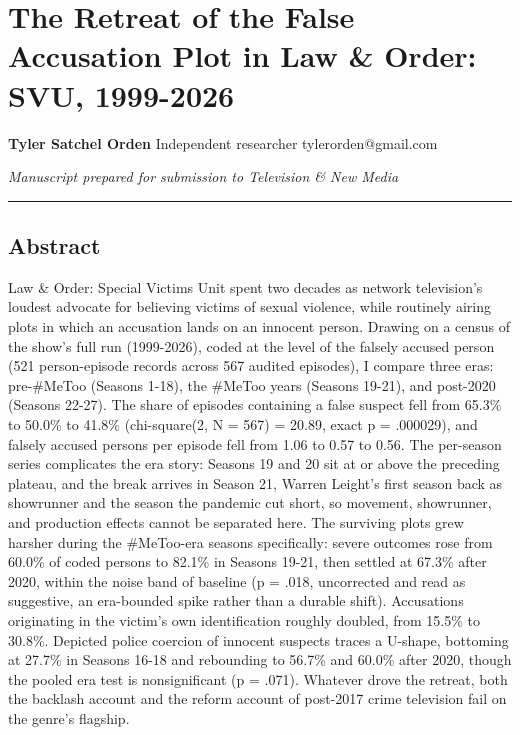 \documentclass[
]{article}
\author{}
\date{}
\begin{document}
\section{The Retreat of the False Accusation Plot in Law \& Order: SVU,
1999-2026}\label{the-retreat-of-the-false-accusation-plot-in-law-order-svu-1999-2026}

\textbf{Tyler Satchel Orden} Independent researcher tylerorden@gmail.com

\emph{Manuscript prepared for submission to Television \& New Media}

\begin{center}\rule{0.5\linewidth}{0.5pt}\end{center}

\subsection{Abstract}\label{abstract}

Law \& Order: Special Victims Unit spent two decades as network
television's loudest advocate for believing victims of sexual violence,
while routinely airing plots in which an accusation lands on an innocent
person. Drawing on a census of the show's full run (1999-2026), coded at
the level of the falsely accused person (521 person-episode records
across 567 audited episodes), I compare three eras: pre-\#MeToo (Seasons
1-18), the \#MeToo years (Seasons 19-21), and post-2020 (Seasons 22-27).
The share of episodes containing a false suspect fell from 65.3\% to
50.0\% to 41.8\% (chi-square(2, N = 567) = 20.89, exact p = .000029),
and falsely accused persons per episode fell from 1.06 to 0.57 to 0.56.
The per-season series complicates the era story: Seasons 19 and 20 sit
at or above the preceding plateau, and the break arrives in Season 21,
Warren Leight's first season back as showrunner and the season the
pandemic cut short, so movement, showrunner, and production effects
cannot be separated here. The surviving plots grew harsher during the
\#MeToo-era seasons specifically: severe outcomes rose from 60.0\% of
coded persons to 82.1\% in Seasons 19-21, then settled at 67.3\% after
2020, within the noise band of baseline (p = .018, uncorrected and read
as suggestive, an era-bounded spike rather than a durable shift).
Accusations originating in the victim's own identification roughly
doubled, from 15.5\% to 30.8\%. Depicted police coercion of innocent
suspects traces a U-shape, bottoming at 27.7\% in Seasons 16-18 and
rebounding to 56.7\% and 60.0\% after 2020, though the pooled era test
is nonsignificant (p = .071). Whatever drove the retreat, both the
backlash account and the reform account of post-2017 crime television
fail on the genre's flagship.
\end{document}
